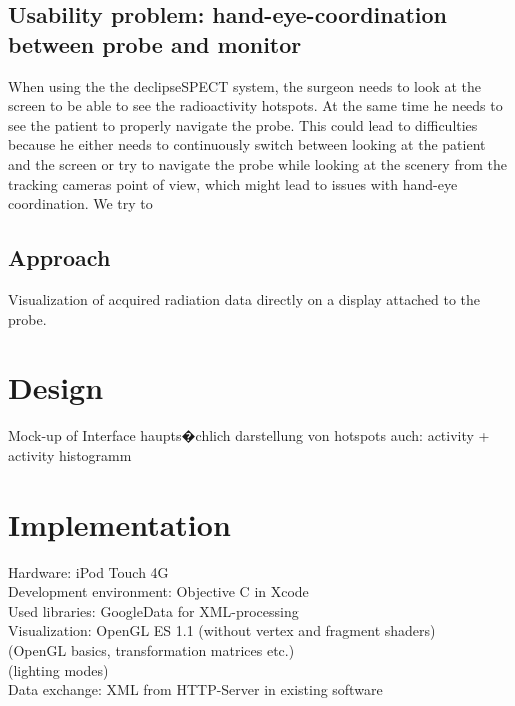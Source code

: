 \documentclass{scrartcl}
\begin{document}
\subsection{Usability problem: hand-eye-coordination between probe and monitor}
When using the the declipseSPECT system, the surgeon needs to look at the screen to be able to see the radioactivity hotspots. At the same time he needs to see the patient to properly navigate the probe. This could lead to difficulties because he either needs to continuously switch between looking at the patient and the screen or try to navigate the probe while looking at the scenery from the tracking cameras point of view, which might lead to issues with hand-eye coordination.
We try to 

\subsection{Approach}
Visualization of acquired radiation data directly on a display attached to the probe.


\section{Design}
Mock-up of Interface
haupts�chlich darstellung von hotspots
auch: activity + activity histogramm


\section{Implementation}
Hardware: iPod Touch 4G\\
Development environment: Objective C in Xcode\\
Used libraries: GoogleData for XML-processing\\
Visualization: OpenGL ES 1.1 (without vertex and fragment shaders)\\
(OpenGL basics, transformation matrices etc.)\\
(lighting modes)\\
Data exchange: XML from HTTP-Server in existing software\\
\end{document}
